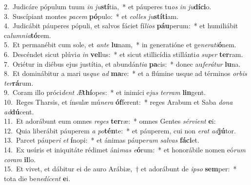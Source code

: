 {2.~}Judicáre pópulum tuum \textit{in} \textit{ju}\textbf{stí}tia,~* et páuperes tu\textit{os} \textit{in} \textit{ju}\textbf{dí}\textbf{ci}o.\\
{3.~}Suscípiant montes \textit{pa}\textit{cem} \textbf{pó}pulo:~* et \textit{col}\textit{les} \textit{ju}\textbf{stí}\textbf{ti}am.\\
{4.~}Judicábit páuperes pópuli, et salvos fáciet fí\textit{li}\textit{os} \textbf{páu}perum:~* et humiliábit ca\textit{lum}\textit{ni}\textit{a}\textbf{tó}rem.\\
{5.~}Et permanébit cum sole, et \textit{an}\textit{te} \textbf{lu}nam,~* in generatióne et ge\textit{ne}\textit{ra}\textit{ti}\textbf{ó}nem.\\
{6.~}Descéndet sicut plúvi\textit{a} \textit{in} \textbf{vel}lus:~* et sicut stillicídia stillánti\textit{a} \textit{su}\textit{per} \textbf{ter}ram.\\
{7.~}Oriétur in diébus ejus justítia, et abundán\textit{ti}\textit{a} \textbf{pa}cis:~* donec au\textit{fe}\textit{rá}\textit{tur} \textbf{lu}na.\\
{8.~}Et dominábitur a mari us\textit{que} \textit{ad} \textbf{ma}re:~* et a flúmine usque ad términos \textit{or}\textit{bis} \textit{ter}\textbf{rá}rum.\\
{9.~}Coram illo próci\textit{dent} \textit{Æ}\textbf{thí}opes:~* et inimíci e\textit{jus} \textit{ter}\textit{ram} \textbf{lin}gent.\\
{10.~}Reges Tharsis, et ínsulæ mú\textit{ne}\textit{ra} \textbf{óf}ferent:~* reges Arabum et Saba \textit{do}\textit{na} \textit{ad}\textbf{dú}cent.\\
{11.~}Et adorábunt eum omnes \textit{re}\textit{ges} \textbf{ter}ræ:~* omnes Gentes \textit{sér}\textit{vi}\textit{ent} \textbf{e}i:\\
{12.~}Quia liberábit páuperem \textit{a} \textit{po}\textbf{tén}te:~* et páuperem, cui non \textit{e}\textit{rat} \textit{ad}\textbf{jú}tor.\\
{13.~}Parcet páupe\textit{ri} \textit{et} \textbf{í}nopi:~* et ánimas páupe\textit{rum} \textit{sal}\textit{vas} \textbf{fá}\textbf{ci}et.\\
{14.~}Ex usúris et iniquitáte rédimet áni\textit{mas} \textit{e}\textbf{ó}rum:~* et honorábile nomen eó\textit{rum} \textit{co}\textit{ram} \textbf{il}lo.\\
{15.~}Et vivet, et dábitur ei de auro Arábiæ,~† et adorábunt de \textit{i}\textit{pso} \textbf{sem}per:~* tota die be\textit{ne}\textit{dí}\textit{cent} \textbf{e}i.\\
